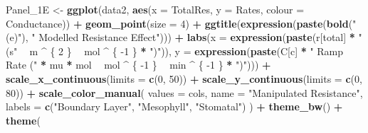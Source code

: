 \documentclass[
]{krantz}
\makeatletter
\newenvironment{Shaded}{\begin{snugshade}}{\end{snugshade}}
\newcommand{\DataTypeTok}[1]{\textcolor[rgb]{0.13,0.29,0.53}{#1}}
\newcommand{\DecValTok}[1]{\textcolor[rgb]{0.00,0.00,0.81}{#1}}
\newcommand{\KeywordTok}[1]{\textcolor[rgb]{0.13,0.29,0.53}{\textbf{#1}}}
\newcommand{\NormalTok}[1]{#1}
\newcommand{\OperatorTok}[1]{\textcolor[rgb]{0.81,0.36,0.00}{\textbf{#1}}}
\newcommand{\StringTok}[1]{\textcolor[rgb]{0.31,0.60,0.02}{#1}}
\newenvironment{kframe}{%
\medskip{}
\setlength{\fboxsep}{.8em}
 \def\at@end@of@kframe{}%
 \ifinner\ifhmode%
  \def\at@end@of@kframe{\end{minipage}}%
  \begin{minipage}{\columnwidth}%
 \fi\fi%
 \def\FrameCommand##1{\hskip\@totalleftmargin \hskip-\fboxsep
 \colorbox{shadecolor}{##1}\hskip-\fboxsep
     \hskip-\linewidth \hskip-\@totalleftmargin \hskip\columnwidth}%
 \MakeFramed {\advance\hsize-\width
   \@totalleftmargin\z@ \linewidth\hsize
   \@setminipage}}%
 {\par\unskip\endMakeFramed%
 \at@end@of@kframe}
\renewenvironment{Shaded}{\begin{kframe}}{\end{kframe}}
\makeatother
\begin{document}
\begin{Shaded}
\begin{Highlighting}[]
\NormalTok{Panel_1E <-}
\StringTok{  }\KeywordTok{ggplot}\NormalTok{(data2, }\KeywordTok{aes}\NormalTok{(}\DataTypeTok{x =}\NormalTok{ TotalRes, }\DataTypeTok{y =}\NormalTok{ Rates, }\DataTypeTok{colour =}\NormalTok{ Conductance)) }\OperatorTok{+}
\StringTok{  }\KeywordTok{geom_point}\NormalTok{(}\DataTypeTok{size =} \DecValTok{4}\NormalTok{) }\OperatorTok{+}
\StringTok{  }\KeywordTok{ggtitle}\NormalTok{(}\KeywordTok{expression}\NormalTok{(}\KeywordTok{paste}\NormalTok{(}\KeywordTok{bold}\NormalTok{(}\StringTok{"(e)"}\NormalTok{), }\StringTok{" Modelled Resistance Effect"}\NormalTok{))) }\OperatorTok{+}
\StringTok{  }\KeywordTok{labs}\NormalTok{(}\DataTypeTok{x =} \KeywordTok{expression}\NormalTok{(}\KeywordTok{paste}\NormalTok{(r[total] }\OperatorTok{*}\StringTok{ " (s"} \OperatorTok{~}\StringTok{ }\NormalTok{m }\OperatorTok{^}\StringTok{ }\NormalTok{\{}
    \DecValTok{2}
\NormalTok{  \} }\OperatorTok{~}\StringTok{ }\NormalTok{mol }\OperatorTok{^}\StringTok{ }\NormalTok{\{}
    \DecValTok{-1}
\NormalTok{  \} }\OperatorTok{*}\StringTok{ ")"}\NormalTok{)), }
  \DataTypeTok{y =} \KeywordTok{expression}\NormalTok{(}\KeywordTok{paste}\NormalTok{(C[c] }\OperatorTok{*}\StringTok{ " Ramp Rate ("} \OperatorTok{*}\StringTok{ }\NormalTok{mu }\OperatorTok{*}\StringTok{ }\NormalTok{mol }\OperatorTok{~}\StringTok{ }\NormalTok{mol }\OperatorTok{^}
\StringTok{                                    }\NormalTok{\{}
                                      \DecValTok{-1}
\NormalTok{                                    \} }\OperatorTok{~}\StringTok{ }\NormalTok{min }\OperatorTok{^}\StringTok{ }\NormalTok{\{}
                                      \DecValTok{-1}
\NormalTok{                                    \} }\OperatorTok{*}\StringTok{ ")"}\NormalTok{))) }\OperatorTok{+}
\StringTok{  }\KeywordTok{scale_x_continuous}\NormalTok{(}\DataTypeTok{limits =} \KeywordTok{c}\NormalTok{(}\DecValTok{0}\NormalTok{, }\DecValTok{50}\NormalTok{)) }\OperatorTok{+}
\StringTok{  }\KeywordTok{scale_y_continuous}\NormalTok{(}\DataTypeTok{limits =} \KeywordTok{c}\NormalTok{(}\DecValTok{0}\NormalTok{, }\DecValTok{80}\NormalTok{)) }\OperatorTok{+}
\StringTok{  }\KeywordTok{scale_color_manual}\NormalTok{(}
    \DataTypeTok{values =}\NormalTok{ cols,}
    \DataTypeTok{name =} \StringTok{"Manipulated Resistance"}\NormalTok{,}
    \DataTypeTok{labels =} \KeywordTok{c}\NormalTok{(}\StringTok{"Boundary Layer"}\NormalTok{, }\StringTok{"Mesophyll"}\NormalTok{, }\StringTok{"Stomatal"}\NormalTok{)}
\NormalTok{  ) }\OperatorTok{+}
\StringTok{  }\KeywordTok{theme_bw}\NormalTok{() }\OperatorTok{+}
\StringTok{  }\KeywordTok{theme}\NormalTok{(}

\end{Highlighting}
\end{Shaded}
\end{document}
